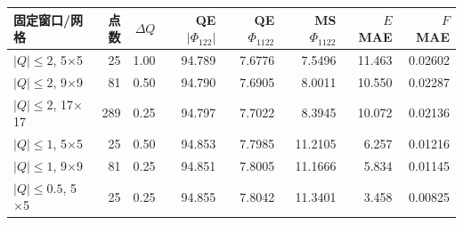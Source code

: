 \begin{tabular}{lrrrrrrr}
\toprule
固定窗口/网格 & 点数 & $\Delta Q$ & QE $|\Phi_{122}|$ & QE $\Phi_{1122}$ & MS $\Phi_{1122}$ & $E$ MAE & $F$ MAE \\
\midrule
$|Q|\leq2$, 5$\times$5 & 25 & 1.00 & 94.789 & 7.6776 & 7.5496 & 11.463 & 0.02602 \\
$|Q|\leq2$, 9$\times$9 & 81 & 0.50 & 94.790 & 7.6905 & 8.0011 & 10.550 & 0.02287 \\
$|Q|\leq2$, 17$\times$17 & 289 & 0.25 & 94.797 & 7.7022 & 8.3945 & 10.072 & 0.02136 \\
$|Q|\leq1$, 5$\times$5 & 25 & 0.50 & 94.853 & 7.7985 & 11.2105 & 6.257 & 0.01216 \\
$|Q|\leq1$, 9$\times$9 & 81 & 0.25 & 94.851 & 7.8005 & 11.1666 & 5.834 & 0.01145 \\
$|Q|\leq0.5$, 5$\times$5 & 25 & 0.25 & 94.855 & 7.8042 & 11.3401 & 3.458 & 0.00825 \\
\bottomrule
\end{tabular}

